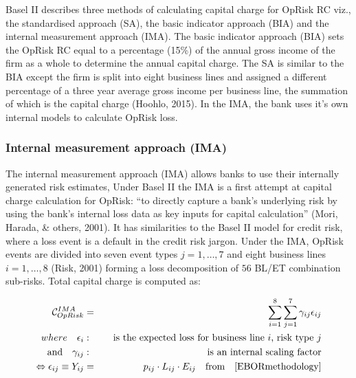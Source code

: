 \documentclass{DissertateUSU}
\begin{document}
Basel II describes three methods of calculating capital charge for
OpRisk RC viz., the standardised approach (SA), the basic indicator
approach (BIA) and the internal measurement approach (IMA). The basic
indicator approach (BIA) sets the OpRisk RC equal to a percentage (15\%)
of the annual gross income of the firm as a whole to determine the
annual capital charge. The SA is similar to the BIA except the firm is
split into eight business lines and assigned a different percentage of a
three year average gross income per business line, the summation of
which is the capital charge (Hoohlo, 2015). In the IMA, the bank uses
it's own internal models to calculate OpRisk loss.

\subsubsection{Internal measurement approach (IMA)}
\label{sssec:Internal measurement approach}

The internal measurement approach (IMA) allows banks to use their
internally generated risk estimates, Under Basel II the IMA is a first
attempt at capital charge calculation for OpRisk: ``to directly capture
a bank's underlying risk by using the bank's internal loss data as key
inputs for capital calculation'' (Mori, Harada, \& others, 2001). It has
similarities to the Basel II model for credit risk, where a loss event
is a default in the credit risk jargon. Under the IMA, OpRisk events are
divided into seven event types \(j=1,\ldots,7\) and eight business lines
\(i=1,\ldots,8\) (Risk, 2001) forming a loss decomposition of \(56\)
BL/ET combination sub-risks. Total capital charge is computed
as:\medskip

\singlespacing

\begin{eqnarray}\label{Internalmeasurement}
\mathcal{\Large{C}}_{OpRisk}^{IMA} &=& \sum_{i=1}^8 \sum_{j=1}^7 \gamma_{ij}\epsilon_{ij} \\
where \quad \epsilon_{i}&:& \quad \mbox{is the expected loss for business line $i$, risk type $j$} \nonumber \\
    \mbox{and} \quad  \gamma_{ij}&:& \quad \mbox{is an internal scaling factor} \nonumber\\
\Leftrightarrow \epsilon_{ij} \equiv Y_{ij} &=& p_{ij} \cdot L_{ij} \cdot E_{ij} \quad \mbox{from}\quad \ref{EBORmethodology}\nonumber\\
\end{eqnarray} \doublespacing
\end{document}
